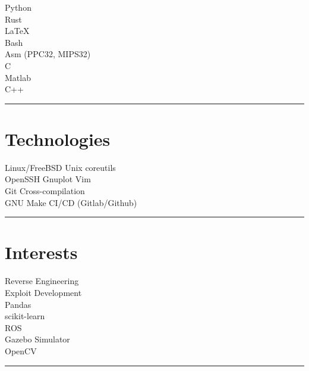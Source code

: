 \documentclass[letterpaper]{deedy-resume}
\begin{document}
\begin{minipage}[t]{0.3\textwidth}
\vspace{1em}

\textbullet{} Python \\
\textbullet{} Rust\\
\textbullet{} \LaTeX \\
\textbullet{} Bash \\
\textbullet{} Asm (PPC32, MIPS32) \\
\textbullet{} C \\
\textbullet{} Matlab \\
\textbullet{} C++ \\

\sectionspace %
\vspace{-1ex}
\rule{5cm}{0.5pt}
\vspace{2em}

\section{Technologies}

\vspace{1em}

Linux/FreeBSD \textbullet{} Unix coreutils\\
OpenSSH \textbullet{} Gnuplot \textbullet{} Vim\\
Git \textbullet{} Cross-compilation\\
GNU Make \textbullet{} CI/CD (Gitlab/Github)
\sectionspace
\vspace{-1.5ex}
\rule{5cm}{0.5pt}
\vspace{2em}


\section{Interests}

\vspace{1em}

\textbullet{} Reverse Engineering\\
\textbullet{} Exploit Development\\
\vspace{1ex}
\textbullet{} Pandas\\
\textbullet{} scikit-learn\\
\vspace{1ex}
\textbullet{} ROS\\
\textbullet{} Gazebo Simulator\\
\vspace{1ex}
\textbullet{} OpenCV\\
\sectionspace
\vspace{-1ex}
\rule{5cm}{0.5pt}
\vspace{2em}


\end{minipage}
\end{document}
